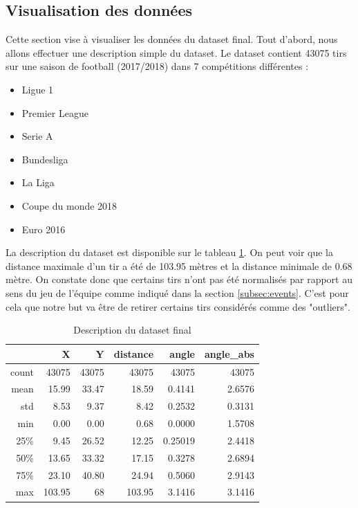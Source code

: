 \documentclass[12pt]{article}
\begin{document}
\subsection{Visualisation des données}
Cette section vise à visualiser les données du dataset final.
Tout d'abord, nous allons effectuer une description simple du dataset.
Le dataset contient 43075 tirs sur une saison de football (2017/2018) dans 7 compétitions différentes :
\begin{itemize}
    \item Ligue 1
    \item Premier League
    \item Serie A
    \item Bundesliga
    \item La Liga
    \item Coupe du monde 2018
    \item Euro 2016
\end{itemize}
La description du dataset est disponible sur le tableau \ref{tab:describe_dataset}.
On peut voir que la distance maximale d'un tir a été de 103.95 mètres et la distance minimale de 0.68 mètre.
On constate donc que certains tirs n'ont pas été normalisés par rapport au sens du jeu de l'équipe comme indiqué dans la section \ref{subsec:events}. 
C'est pour cela que notre but va être de retirer certains tirs considérés comme des "outliers".
\begin{table}[htp]
    \centering
    \begin{tabular}{r|r|r|r|r|r|}
        \cline{2-6}
        \textbf{}                   & \textbf{X}   & \textbf{Y}   & \textbf{distance} & \textbf{angle} & \textbf{angle\_abs} \\ \hline
        \multicolumn{1}{|r|}{count} & 43075 & 43075 & 43075      & 43075   & 43075        \\ \hline
        \multicolumn{1}{|r|}{mean}  & 15.99    & 33.47    & 18.59         & 0.4141       & 2.6576            \\ \hline
        \multicolumn{1}{|r|}{std}   & 8.53     & 9.37     & 8.42          & 0.2532       & 0.3131            \\ \hline
        \multicolumn{1}{|r|}{min}   & 0.00     & 0.00     & 0.68          & 0.0000       & 1.5708            \\ \hline
        \multicolumn{1}{|r|}{25\%}  & 9.45     & 26.52    & 12.25         & 0.25019       & 2.4418            \\ \hline
        \multicolumn{1}{|r|}{50\%}  & 13.65    & 33.32    & 17.15         & 0.3278       & 2.6894            \\ \hline
        \multicolumn{1}{|r|}{75\%}  & 23.10   & 40.80    & 24.94         & 0.5060       & 2.9143            \\ \hline
        \multicolumn{1}{|r|}{max}   & 103.95   & 68    & 103.95        & 3.1416       & 3.1416            \\ \hline
        \end{tabular}
    \caption{Description du dataset final}
    \label{tab:describe_dataset}
\end{table}
\end{document}
